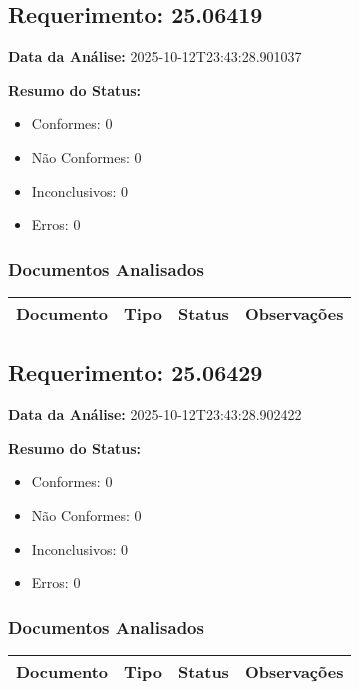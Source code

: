 \documentclass[12pt,a4paper]{article}
\begin{document}
\subsection{Requerimento: 25.06419}

\textbf{Data da Análise:} 2025-10-12T23:43:28.901037

\textbf{Resumo do Status:}
\begin{itemize}
    \item Conformes: 0
    \item Não Conformes: 0
    \item Inconclusivos: 0
    \item Erros: 0
\end{itemize}

\subsubsection{Documentos Analisados}

\begin{longtable}{|p{4cm}|p{2cm}|p{2cm}|p{6cm}|}
\hline
\textbf{Documento} & \textbf{Tipo} & \textbf{Status} & \textbf{Observações} \\
\hline
\endhead
\end{longtable}


\subsection{Requerimento: 25.06429}

\textbf{Data da Análise:} 2025-10-12T23:43:28.902422

\textbf{Resumo do Status:}
\begin{itemize}
    \item Conformes: 0
    \item Não Conformes: 0
    \item Inconclusivos: 0
    \item Erros: 0
\end{itemize}

\subsubsection{Documentos Analisados}

\begin{longtable}{|p{4cm}|p{2cm}|p{2cm}|p{6cm}|}
\hline
\textbf{Documento} & \textbf{Tipo} & \textbf{Status} & \textbf{Observações} \\
\hline
\endhead
\end{longtable}
\end{document}
